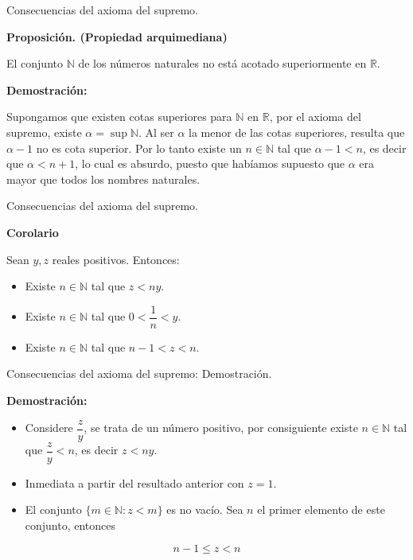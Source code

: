 \documentclass[
  ignorenonframetext,
]{beamer}
\providecommand{\tightlist}{%
  \setlength{\itemsep}{0pt}\setlength{\parskip}{0pt}}
\begin{document}
\begin{frame}{Consecuencias del axioma del supremo.}
\protect\hypertarget{consecuencias-del-axioma-del-supremo.}{}

\textbf{Proposición. (Propiedad arquimediana)}

El conjunto \(\mathbb{N}\) de los números naturales no está acotado
superiormente en \(\mathbb{R}\).

\textbf{Demostración:}

Supongamos que existen cotas superiores para \(\mathbb{N}\) en
\(\mathbb{R}\), por el axioma del supremo, existe
\(\alpha = \sup \mathbb{N}\). Al ser \(\alpha\) la menor de las cotas
superiores, resulta que \(\alpha -1\) no es cota superior. Por lo tanto
existe un \(n \in \mathbb{N}\) tal que \(\alpha -1 <n\), es decir que
\(\alpha < n+1\), lo cual es absurdo, puesto que habíamos supuesto que
\(\alpha\) era mayor que todos los nombres naturales.

\end{frame}

\begin{frame}{Consecuencias del axioma del supremo.}
\protect\hypertarget{consecuencias-del-axioma-del-supremo.-1}{}

\textbf{Corolario}

Sean \(y,z\) reales positivos. Entonces:

\begin{itemize}
\tightlist
\item
  Existe \(n \in \mathbb{N}\) tal que \(z<ny\).
\item
  Existe \(n \in \mathbb{N}\) tal que \(0 <\dfrac{1}{n}<y\).
\item
  Existe \(n \in \mathbb{N}\) tal que \(n-1 <z < n\).
\end{itemize}

\end{frame}

\begin{frame}{Consecuencias del axioma del supremo: Demostración.}
\protect\hypertarget{consecuencias-del-axioma-del-supremo-demostraciuxf3n.}{}

\textbf{Demostración:}

\begin{itemize}
\item
  Considere \(\dfrac{z}{y}\), se trata de un número positivo, por
  consiguiente existe \(n \in \mathbb{N}\) tal que \(\dfrac{z}{y} <n\),
  es decir \(z < ny\).
\item
  Inmediata a partir del resultado anterior con \(z=1\).
\item
  El conjunto \(\{ m \in \mathbb{N}: z<m \}\) es no vacío. Sea \(n\) el
  primer elemento de este conjunto, entonces
\end{itemize}

\[
n-1 \leq z < n
\]

\end{frame}
\end{document}
